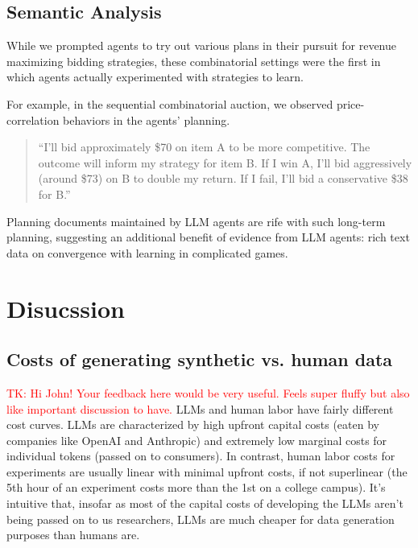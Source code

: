 \documentclass{article} %
\newcommand{\TK}[1]{\textcolor{red}{TK: #1}}
\begin{document}
\subsection{Semantic Analysis}
While we prompted agents to try out various plans in their pursuit for revenue maximizing bidding strategies, these combinatorial settings were the first in which agents actually experimented with strategies to learn. 

For example, in the sequential combinatorial auction, we observed price-correlation behaviors in the agents' planning.
\begin{quote}
    ``I'll bid approximately \$70 on item A to be more competitive. The outcome will inform my strategy for item B. If I win A, I'll bid aggressively (around \$73) on B to double my return. If I fail, I'll bid a conservative \$38 for B.''
\end{quote}

Planning documents maintained by LLM agents are rife with such long-term planning, suggesting an additional benefit of evidence from LLM agents: rich text data on convergence with learning in complicated games.


\section{Disucssion}
\subsection{Costs of generating synthetic vs. human data}
\TK{Hi John! Your feedback here would be very useful. 
Feels super fluffy but also like important discussion to have.}
LLMs and human labor have fairly different cost curves. 
LLMs are characterized by high upfront capital costs (eaten by companies like OpenAI and Anthropic) and extremely low marginal costs for individual tokens (passed on to consumers). 
In contrast, human labor costs for experiments are usually linear with minimal upfront costs, if not superlinear (the 5th hour of an experiment costs more than the 1st on a college campus). 
It's intuitive that, insofar as most of the capital costs of developing the LLMs aren't being passed on to us researchers, LLMs are much cheaper for data generation purposes than humans are.
\end{document}
